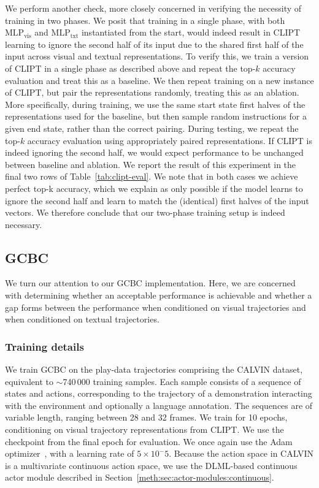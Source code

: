 \documentclass[../main.tex]{subfiles}
\begin{document}
We perform another check, more closely concerned in verifying the necessity of training in two
phases. We posit that training in a single phase, with both $\text{MLP}_\text{vis}$ and
$\text{MLP}_\text{txt}$ instantiated from the start, would indeed result in CLIPT learning to ignore
the second half of its input due to the shared first half of the input across visual and textual
representations. To verify this, we train a version of CLIPT in a single phase as described above
and repeat the top-$k$ accuracy evaluation and treat this as a baseline. We then repeat training on
a new instance of CLIPT, but pair the representations randomly, treating this as an ablation. More
specifically, during training, we use the same start state first halves of the representations used
for the baseline, but then sample random instructions for a given end state, rather than the correct
pairing. During testing, we repeat the top-$k$ accuracy evaluation using appropriately paired
representations. If CLIPT is indeed ignoring the second half, we would expect performance to be
unchanged between baseline and ablation. We report the result of this experiment in the final two
rows of Table~\ref{tab:clipt-eval}. We note that in both cases we achieve perfect top-k accuracy,
which we explain as only possible if the model learns to ignore the second half and learn to match
the (identical) first halves of the input vectors. We therefore conclude that our two-phase training
setup is indeed necessary.

\subsection{GCBC}

We turn our attention to our GCBC implementation. Here, we are concerned with determining whether an
acceptable performance is achievable and whether a gap forms between the performance when
conditioned on visual trajectories and when conditioned on textual trajectories.

\subsubsection{Training details}

We train GCBC on the play-data trajectories comprising the CALVIN dataset, equivalent to
$\sim$740\,000 training samples. Each sample consists of a sequence of states and actions,
corresponding to the trajectory of a demonstration interacting with the environment and optionally
a language annotation. The sequences are of variable length, ranging between 28 and 32 frames. We
train for 10 epochs, conditioning on visual trajectory representations from CLIPT. We use the
checkpoint from the final epoch for evaluation. We once again use the Adam
optimizer~\citep{kingma_adam_2015}, with a learning rate of $5 \times 10^-5$. Because the action
space in CALVIN is a multivariate continuous action space, we use the DLML-based continuous actor
module described in Section~\ref{meth:sec:actor-modules:continuous}.
\end{document}
